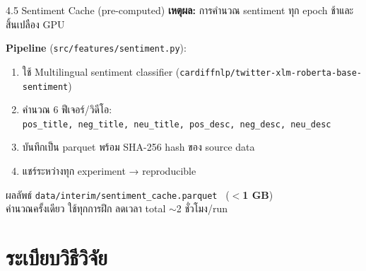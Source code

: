 \documentclass[aspectratio=169,11pt,xcolor=dvipsnames]{beamer}
\newcommand{\hl}[1]{\textcolor{kmitlOrange}{\textbf{#1}}}
\begin{document}
\begin{frame}{4.5 Sentiment Cache (pre-computed)}
  \textbf{เหตุผล:} การคำนวณ sentiment ทุก epoch ช้าและสิ้นเปลือง GPU
  \vspace{0.4em}

  \textbf{Pipeline} (\texttt{src/features/sentiment.py}):
  \begin{enumerate}
    \item ใช้ Multilingual sentiment classifier (\texttt{cardiffnlp/twitter-xlm-roberta-base-sentiment})
    \item คำนวณ 6 ฟีเจอร์/วิดีโอ:\\
      \texttt{pos\_title, neg\_title, neu\_title, pos\_desc, neg\_desc, neu\_desc}
    \item บันทึกเป็น parquet พร้อม SHA-256 hash ของ source data
    \item แชร์ระหว่างทุก experiment → reproducible
  \end{enumerate}
  \vspace{0.4em}
  \begin{block}{ผลลัพธ์}
    \texttt{data/interim/sentiment\_cache.parquet} \ (\hl{$<$1 GB})\\
    คำนวณครั้งเดียว ใช้ทุกการฝึก ลดเวลา total $\sim$2 ชั่วโมง/run
  \end{block}
\end{frame}

\section{ระเบียบวิธีวิจัย}
\end{document}
